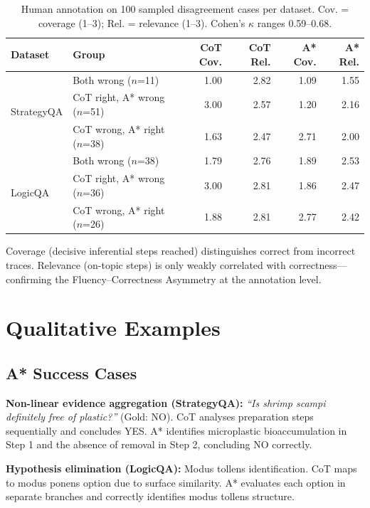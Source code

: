 \documentclass[11pt]{article}
\begin{document}
\begin{table}[h]
\centering
\caption{Human annotation on 100 sampled disagreement cases per dataset. Cov. = coverage (1--3); Rel. = relevance (1--3). Cohen's $\kappa$ ranges 0.59--0.68.}
\label{tab:human}
\small
\begin{tabular}{llrrrr}
\toprule
\textbf{Dataset} & \textbf{Group} & \textbf{CoT Cov.} & \textbf{CoT Rel.} & \textbf{A* Cov.} & \textbf{A* Rel.} \\
\midrule
\multirow{3}{*}{StrategyQA}
  & Both wrong ($n$=11)           & 1.00 & 2.82 & 1.09 & 1.55 \\
  & CoT right, A* wrong ($n$=51) & 3.00 & 2.57 & 1.20 & 2.16 \\
  & CoT wrong, A* right ($n$=38) & 1.63 & 2.47 & 2.71 & 2.00 \\
\midrule
\multirow{3}{*}{LogicQA}
  & Both wrong ($n$=38)           & 1.79 & 2.76 & 1.89 & 2.53 \\
  & CoT right, A* wrong ($n$=36) & 3.00 & 2.81 & 1.86 & 2.47 \\
  & CoT wrong, A* right ($n$=26) & 1.88 & 2.81 & 2.77 & 2.42 \\
\bottomrule
\end{tabular}
\end{table}

Coverage (decisive inferential steps reached) distinguishes correct from incorrect traces. Relevance (on-topic steps) is only weakly correlated with correctness—confirming the Fluency--Correctness Asymmetry at the annotation level.

\section{Qualitative Examples}
\label{app:examples}

\subsection{A* Success Cases}

\noindent\textbf{Non-linear evidence aggregation (StrategyQA):}
\textit{``Is shrimp scampi definitely free of plastic?''} (Gold: NO). CoT analyses preparation steps sequentially and concludes YES. A* identifies microplastic bioaccumulation in Step 1 and the absence of removal in Step 2, concluding NO correctly.

\noindent\textbf{Hypothesis elimination (LogicQA):}
Modus tollens identification. CoT maps to modus ponens option due to surface similarity. A* evaluates each option in separate branches and correctly identifies modus tollens structure.
\end{document}
